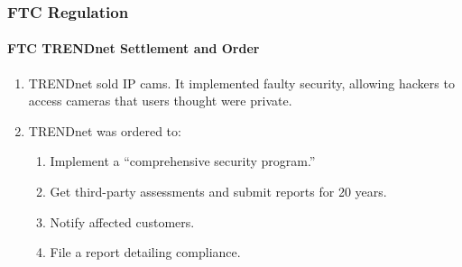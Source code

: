 \subsubsection{FTC Regulation}

\paragraph{FTC TRENDnet Settlement and Order}

\begin{enumerate}
    \item TRENDnet sold IP cams. It implemented faulty security, allowing 
    hackers to access cameras that users thought were private.
    \item TRENDnet was ordered to:
    \begin{enumerate}
        \item Implement a ``comprehensive security program.''
        \item Get third-party assessments and submit reports for 20 years.
        \item Notify affected customers.
        \item File a report detailing compliance.
    \end{enumerate}
\end{enumerate}

